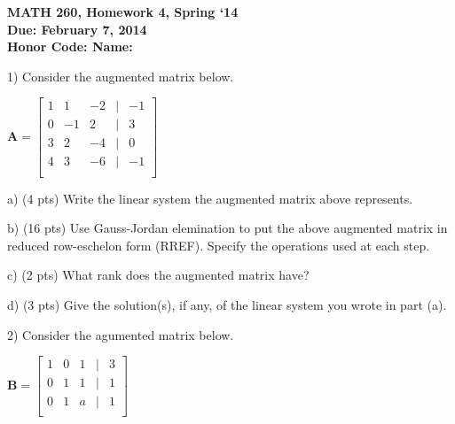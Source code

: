 \documentclass{article}
\begin{document}
\begin{flushleft}
	\bfseries{MATH 260, Homework 4, Spring `14}\\
	\bfseries{Due: February 7, 2014}\\
	\bfseries{Honor Code:} \hspace{3.5in}\bfseries{Name:}\\
\end{flushleft}
\begin{flushleft}
\vspace{.25in}

1) Consider the augmented matrix below.

\vspace{0.2in}

\begin{center}
$\textbf{A}=\left[
\begin{array}{rrrcr}
1  & 1 &-2 & | &-1\\
0  &-1 & 2 & | & 3\\
3  & 2 &-4 & | & 0\\
4  & 3 &-6 & | &-1\\
\end{array}
\right]$
\end{center}

a) (4 pts) Write the linear system the augmented matrix above represents.

\vspace{1.5in}

b) (16 pts) Use Gauss-Jordan elemination to put the above augmented matrix in reduced row-eschelon form (RREF).  Specify the operations used at each step.

\pagebreak

c) (2 pts) What rank does the augmented matrix have?

\vspace{1in}

d) (3 pts) Give the solution(s), if any, of the linear system you wrote in part (a).

\vspace{1.5in}

2) Consider the agumented matrix below.

\vspace{0.2in}

\begin{center}
$\textbf{B}=\left[
\begin{array}{rrrcr}
1  & 0 & 1 & | & 3\\
0  & 1 & 1 & | & 1\\
0  & 1 & a & | & 1\\
\end{array}
\right]$
\end{center}


\end{flushleft}
\end{document}
